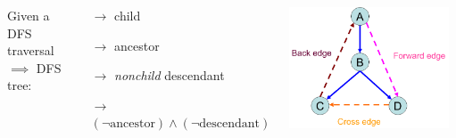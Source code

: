 \begin{frame}
  \begin{definition}
    \begin{columns}
	Given a DFS traversal $\implies$ DFS tree:
	\begin{description}
	  \item[Tree edge:] $\to$ child \\[10pt]
	  \item[Back edge:] $\to$ ancestor
	  \item[Forward edge:] $\to$ \emph{nonchild} descendant
	  \item[Cross edge:] $\to$ $(\lnot \text{ancestor}) \land (\lnot \text{descendant})$
	\end{description}
	\includegraphics[width = 0.95\textwidth]{figs/dfs-digraph.png}
    \end{columns}
  \end{definition}

  \pause
  \vspace{0.50cm}
  \begin{center}
  \end{center}
\end{frame}

